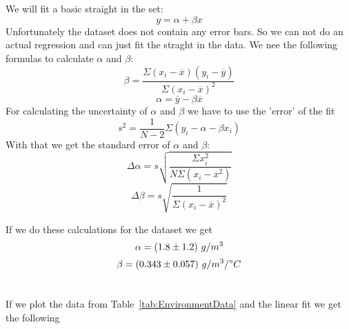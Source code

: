 \documentclass[11pt]{article}
\begin{document}
    \section{}
    We will fit a basic straight in the set:
    \begin{equation}
        y = \alpha + \beta x
    \end{equation}
    Unfortunately the dataset does not contain any error bars.
    So we can not do an actual regression and can just fit the straght in the data.
    We nee the following formulas to calculate $\alpha$ and $\beta$:
    \begin{equation}
        \beta = \frac{\Sigma (x_i - \overline{x}) (y_i - \overline{y})}{\Sigma (x_i - \overline{x})^2} 
    \end{equation}
    \begin{equation}
        \alpha = \overline{y} - \beta \overline{x}
    \end{equation}
    For calculating the uncertainty of $\alpha$ and $\beta$ we have to use the 'error' of the fit
    \begin{equation}
        s^2 = \frac{1}{N-2}\Sigma (y_i - \alpha - \beta x_i)
    \end{equation}
    With that we get the standard error of $\alpha$ and $\beta$:
    \begin{equation}
        \Delta\alpha = s \sqrt { \frac{\Sigma x_i^2}{N \Sigma (x_i - \overline{x}^2)}}
    \end{equation}
    \begin{equation}
        \Delta\beta = s \sqrt {\frac{1}{\Sigma (x_i - \overline{x})^2}}
    \end{equation}

    If we do these calculations for the dataset we get
    \begin{equation*}
        \alpha = (1.8 \pm 1.2)\ g / m^3
    \end{equation*}
    \begin{equation*}
        \beta = (0.343 \pm 0.057)\ g / m^3 / ^{\circ} C
    \end{equation*}

    \section{}
    If we plot the data from Table~\ref{tab:EnvironmentData} and the linear fit we get the following
    \figEnvironmentRegression
\end{document}
